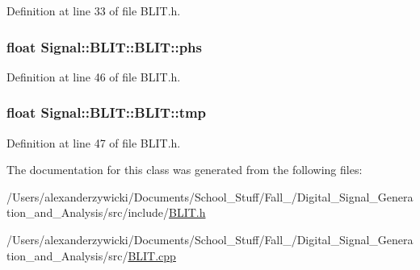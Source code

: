 Definition at line 33 of file B\+L\+I\+T.\+h.

\hypertarget{classSignal_1_1BLIT_1_1BLIT_afd06bf26696642f7eb400fb984e524f3}{
\subsubsection[{phs}]{\setlength{\rightskip}{0pt plus 5cm}float Signal\+::\+B\+L\+I\+T\+::\+B\+L\+I\+T\+::phs\hspace{0.3cm}{\ttfamily [protected]}}}\label{classSignal_1_1BLIT_1_1BLIT_afd06bf26696642f7eb400fb984e524f3}


Definition at line 46 of file B\+L\+I\+T.\+h.

\hypertarget{classSignal_1_1BLIT_1_1BLIT_aa543d207e6dd260762652221c598bae9}{
\subsubsection[{tmp}]{\setlength{\rightskip}{0pt plus 5cm}float Signal\+::\+B\+L\+I\+T\+::\+B\+L\+I\+T\+::tmp\hspace{0.3cm}{\ttfamily [protected]}}}\label{classSignal_1_1BLIT_1_1BLIT_aa543d207e6dd260762652221c598bae9}


Definition at line 47 of file B\+L\+I\+T.\+h.



The documentation for this class was generated from the following files\+:\begin{DoxyCompactItemize}
\item 
/\+Users/alexanderzywicki/\+Documents/\+School\+\_\+\+Stuff/\+Fall\+\_/\+Digital\+\_\+\+Signal\+\_\+\+Generation\+\_\+and\+\_\+\+Analysis/src/include/\hyperlink{BLIT_8h}{B\+L\+I\+T.\+h}\item 
/\+Users/alexanderzywicki/\+Documents/\+School\+\_\+\+Stuff/\+Fall\+\_/\+Digital\+\_\+\+Signal\+\_\+\+Generation\+\_\+and\+\_\+\+Analysis/src/\hyperlink{BLIT_8cpp}{B\+L\+I\+T.\+cpp}\end{DoxyCompactItemize}
